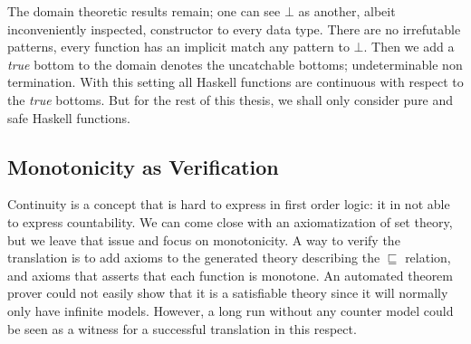 The domain theoretic results remain; one can see $\bot$ as another,
albeit inconveniently inspected, constructor to every data type. There
are no irrefutable patterns, every function has an implicit match any
pattern to $\bot$.  Then we add a \emph{true} bottom to the domain
denotes the uncatchable bottoms; undeterminable non termination. With
this setting all Haskell functions are continuous with respect to the
\emph{true} bottoms. But for the rest of this thesis, we shall only
consider pure and safe Haskell functions.

\subsection{Monotonicity as Verification}

Continuity is a concept that is hard to express in first order logic:
it in not able to express countability. We can come close with an
axiomatization of set theory, but we leave that issue and focus on
monotonicity. A way to verify the translation is to add axioms to the
generated theory describing the $\sqsubseteq$ relation, and axioms
that asserts that each function is monotone. An automated theorem
prover could not easily show that it is a satisfiable theory since it
will normally only have infinite models. However, a long run without
any counter model could be seen as a witness for a successful
translation in this respect.
